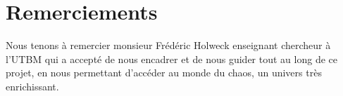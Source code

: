 \chapter*{Remerciements}

Nous tenons à remercier monsieur Frédéric Holweck enseignant chercheur à l'UTBM qui a accepté de nous encadrer et de nous guider tout au long de ce projet, en nous permettant d'accéder au monde du chaos, un univers très enrichissant.